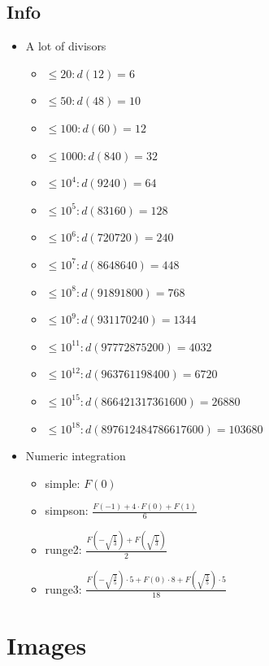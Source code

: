 \subsection{Info}
\begin{itemize}
	\item A lot of divisors
	\begin{itemize}
		\item $\leq 20: d(12)=6$
		\item $\leq 50: d(48)=10$
		\item $\leq 100: d(60)=12$
		\item $\leq 1000: d(840)=32$
		\item $\leq 10^4: d(9240)=64$
		\item $\leq 10^5: d(83160)=128$
		\item $\leq 10^6: d(720720)=240$
		\item $\leq 10^7: d(8648640)=448$
		\item $\leq 10^8: d(91891800)=768$
		\item $\leq 10^9: d(931170240)=1344$
		\item $\leq 10^{11}: d(97772875200)=4032$
		\item $\leq 10^{12}: d(963761198400)=6720$
		\item $\leq 10^{15}: d(866421317361600)=26880$
		\item $\leq 10^{18}: d(897612484786617600)=103680$
	\end{itemize}

	\item Numeric integration
	\begin{itemize}
		\item simple: $F(0)$
		\item simpson: $\frac{F(-1) + 4 \cdot F(0) + F(1)}{6}$
		\item runge2: $\frac{ F(-\sqrt{\frac{1}{3}}) + F(\sqrt{\frac{1}{3}}) }{2}$
		\item runge3: $\frac{ F(-\sqrt{\frac{3}{5}}) \cdot 5 + F(0) \cdot 8 +  F(\sqrt{\frac{3}{5}}) \cdot 5}{18}$
	\end{itemize}
\end{itemize}	

\section{Images}
